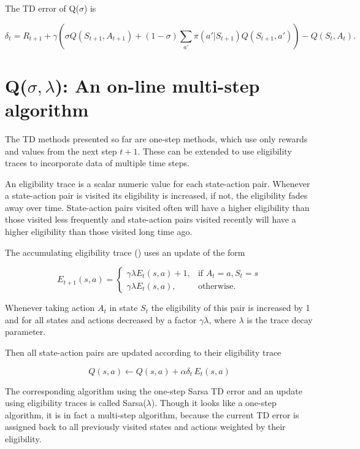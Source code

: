\documentclass{article} %
\begin{document}
The TD error of Q($\sigma$) is 

\begin{equation} 
\delta_t = R_{t+1} + \gamma ( \sigma Q(S_{t+1}, A_{t+1}) + (1 - \sigma) \sum_{a'} \pi(a' | S_{t+1}) Q(S_{t+1}, a') ) - Q(S_t, A_t).
\end{equation}

\section{Q($\sigma, \lambda$): An on-line multi-step algorithm}

The TD methods presented so far are one-step methods, which use only rewards and values from the next step $t+1$. These can be extended to use eligibility traces to incorporate data of multiple time steps.

An eligibility trace is a scalar numeric value for each state-action pair. Whenever a state-action pair is visited its eligibility is increased, if not, the eligibility fades away over time. State-action pairs visited often will have a higher eligibility than those visited less frequently and state-action pairs visited recently will have a higher eligibility than those visited long time ago.

The accumulating eligibility trace (\cite{eligibility}) uses an update of the form

\begin{equation}
    E_{t+1}(s, a) =
\begin{cases}
    \gamma \lambda E_t(s, a) + 1, & \text{if } A_t = a, S_t = s\\
    \gamma \lambda E_t(s, a) ,    & \text{otherwise.}
\end{cases}
\end{equation}

Whenever taking action $A_t$ in state $S_t$ the eligibility of this pair is increased by 1 and for all states and actions decreased by a factor $\gamma \lambda$, where $\lambda$ is the trace decay parameter. 

Then all state-action pairs are updated according to their eligibility trace

\begin{equation}
Q(s, a) \leftarrow Q(s, a) + \alpha \delta_t \, E_t(s, a) 
\end{equation}

The corresponding algorithm using the one-step Sarsa TD error and an update using eligibility traces is called Sarsa($\lambda$). Though it looks like a one-step algorithm, it is in fact a multi-step algorithm, because the current TD error is assigned back to all previously visited states and actions weighted by their eligibility. 
\end{document}
